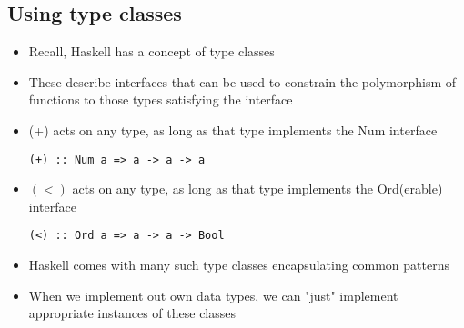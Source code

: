 \documentclass{article}[18pt]
\begin{document}
\subsection{Using type classes}
\begin{itemize}
	\item Recall, Haskell has a concept of type classes
	\item These describe interfaces that can be used to constrain the polymorphism of functions to those types satisfying the interface
	\item (+) acts on any type, as long as that type implements the Num interface
\begin{verbatim}
(+) :: Num a => a -> a -> a
\end{verbatim}
	\item $(<)$ acts on any type, as long as that type implements the Ord(erable) interface
\begin{verbatim}
(<) :: Ord a => a -> a -> Bool
\end{verbatim}
	\item Haskell comes with many such type classes encapsulating common patterns
	\item When we implement out own data types, we can "just" implement appropriate instances of these classes
\end{itemize}
\end{document}
